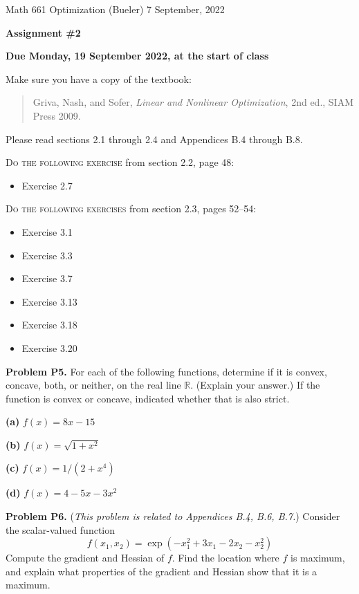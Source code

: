 \documentclass[12pt]{amsart}
\newcommand{\RR}{\mathbb{R}}
\newcommand{\prob}[1]{\bigskip\noindent\textbf{#1}\quad }
\newcommand{\epart}[1]{\medskip\noindent\textbf{(#1)}\quad }
\begin{document}
\scriptsize \noindent Math 661 Optimization (Bueler) \hfill 7 September, 2022
\normalsize

\medskip\bigskip

\Large\centerline{\textbf{Assignment \#2}}
\large
\bigskip

\centerline{\textbf{Due Monday, 19 September 2022, at the start of class}}
\bigskip
\normalsize

\thispagestyle{empty}

\bigskip
\noindent Make sure you have a copy of the textbook:

\begin{quote}
Griva, Nash, and Sofer, \emph{Linear and Nonlinear Optimization}, 2nd ed., SIAM Press 2009.
\end{quote}

\noindent Please read sections 2.1 through 2.4 and Appendices B.4 through B.8.

\bigskip
\noindent \textsc{Do the following exercise} from section 2.2, page 48:

\begin{itemize}
\item Exercise 2.7
\end{itemize}

\bigskip
\noindent \textsc{Do the following exercises} from section 2.3, pages 52--54:

\begin{itemize}
\item Exercise 3.1
\item Exercise 3.3
\item Exercise 3.7
\item Exercise 3.13
\item Exercise 3.18
\item Exercise 3.20
\end{itemize}

\prob{Problem P5.}  For each of the following functions, determine if it is convex, concave, both, or neither, on the real line $\RR$.  (Explain your answer.)  If the function is convex or concave, indicated whether that is also strict.

\epart{a}  $f(x) = 8x - 15$

\epart{b}  $f(x) = \sqrt{1 + x^2}$

\epart{c}  $f(x) = 1 / (2+x^4)$

\epart{d}  $f(x) = 4 - 5 x - 3 x^2$


\prob{Problem P6.}  (\emph{This problem is related to Appendices B.4, B.6, B.7.})  Consider the scalar-valued function
    $$f(x_1,x_2) = \exp(-x_1^2 + 3 x_1 - 2 x_2 - x_2^2)$$
Compute the gradient and Hessian of $f$.  Find the location where $f$ is maximum, and explain what properties of the gradient and Hessian show that it is a maximum.
\end{document}
